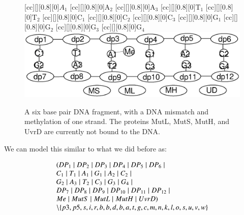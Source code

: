 \begin{figure}[h!]
[cc][][0.8][0]{$A_1$}
[cc][][0.8][0]{${\mathrm{A_2}}$}
[cc][][0.8][0]{${\mathrm{A_3}}$}
[cc][][0.8][0]{${\mathrm{T_1}}$}
[cc][][0.8][0]{${\mathrm{T_2}}$}
[cc][][0.8][0]{${\mathrm{C_1}}$}
[cc][][0.8][0]{${\mathrm{C_2}}$}
[cc][][0.8][0]{${\mathrm{C_3}}$}
[cc][][0.8][0]{${\mathrm{G_1}}$}
[cc][][0.8][0]{${\mathrm{G_2}}$}
[cc][][0.8][0]{${\mathrm{G_3}}$}
[cc][][0.8][0]{${\mathrm{G_4}}$}
  \centering
    \includegraphics[width=1.0\textwidth]{mmr/state1}
  \caption[A six base pair DNA fragment.]{A six base pair DNA fragment, with a DNA mismatch and methylation of one strand. The proteins MutL, MutS, MutH, and UvrD are currently not bound to the DNA.}
  \label{fig:state1}
\end{figure}

We can model this similar to what we did before as:

$$\begin{array}{l}
(DP_1 \; \vert \; DP_2 \; \vert \; DP_3 \; \vert \; DP_4 \; \vert \; DP_5 \; \vert \; DP_6 \; \vert \; \\
C_1 \; \vert \; T_1 \; \vert \; A_1 \; \vert \; G_1 \; \vert \; A_2 \; \vert \; C_2 \; \vert \; \\
G_2 \; \vert \; A_3 \; \vert \; T_2 \; \vert \; C_3 \; \vert \; G_3 \; \vert \; G_4 \; \vert \; \\
DP_7 \; \vert \; DP_8 \; \vert \; DP_9 \; \vert \; DP_{10} \; \vert \; DP_{11} \; \vert \; DP_{12} \; \vert \; \\
Me \; \vert \; MutS \; \vert \; MutL \; \vert \; MutH \; \vert \; UvrD) \\
\setminus\{p3, p5, s, i, r, b, b, d, b, a, t, g, c, m, n, k, l, o, s, u, v, w\} 
\end{array}$$ 

